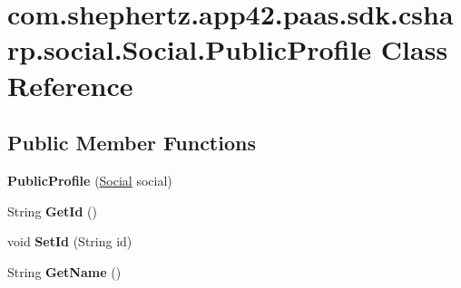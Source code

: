\hypertarget{classcom_1_1shephertz_1_1app42_1_1paas_1_1sdk_1_1csharp_1_1social_1_1_social_1_1_public_profile}{\section{com.\+shephertz.\+app42.\+paas.\+sdk.\+csharp.\+social.\+Social.\+Public\+Profile Class Reference}
\label{classcom_1_1shephertz_1_1app42_1_1paas_1_1sdk_1_1csharp_1_1social_1_1_social_1_1_public_profile}
}
\subsection*{Public Member Functions}
\begin{DoxyCompactItemize}
\item 
\hypertarget{classcom_1_1shephertz_1_1app42_1_1paas_1_1sdk_1_1csharp_1_1social_1_1_social_1_1_public_profile_a7ae45f49c4d6f9b5ad976c544afc0a52}{{\bfseries Public\+Profile} (\hyperlink{classcom_1_1shephertz_1_1app42_1_1paas_1_1sdk_1_1csharp_1_1social_1_1_social}{Social} social)}\label{classcom_1_1shephertz_1_1app42_1_1paas_1_1sdk_1_1csharp_1_1social_1_1_social_1_1_public_profile_a7ae45f49c4d6f9b5ad976c544afc0a52}

\item 
\hypertarget{classcom_1_1shephertz_1_1app42_1_1paas_1_1sdk_1_1csharp_1_1social_1_1_social_1_1_public_profile_ae327131daaf90a672de5b0d0f156b0f7}{String {\bfseries Get\+Id} ()}\label{classcom_1_1shephertz_1_1app42_1_1paas_1_1sdk_1_1csharp_1_1social_1_1_social_1_1_public_profile_ae327131daaf90a672de5b0d0f156b0f7}

\item 
\hypertarget{classcom_1_1shephertz_1_1app42_1_1paas_1_1sdk_1_1csharp_1_1social_1_1_social_1_1_public_profile_a03824037bd24485026b71a7091ce5db1}{void {\bfseries Set\+Id} (String id)}\label{classcom_1_1shephertz_1_1app42_1_1paas_1_1sdk_1_1csharp_1_1social_1_1_social_1_1_public_profile_a03824037bd24485026b71a7091ce5db1}

\item 
\hypertarget{classcom_1_1shephertz_1_1app42_1_1paas_1_1sdk_1_1csharp_1_1social_1_1_social_1_1_public_profile_a1004a8fcab92a8ea33b1c0732dca2eee}{String {\bfseries Get\+Name} ()}\label{classcom_1_1shephertz_1_1app42_1_1paas_1_1sdk_1_1csharp_1_1social_1_1_social_1_1_public_profile_a1004a8fcab92a8ea33b1c0732dca2eee}


\end{DoxyCompactItemize}
